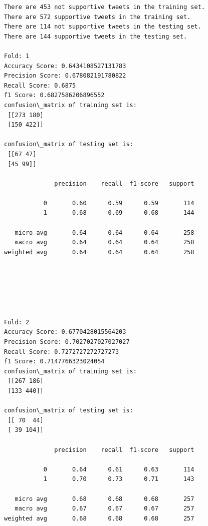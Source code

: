 \documentclass[11pt]{article}
\begin{document}
  

    \begin{Verbatim}[commandchars=\\\{\}]
There are 453 not supportive tweets in the training set.
There are 572 supportive tweets in the training set.
There are 114 not supportive tweets in the testing set.
There are 144 supportive tweets in the testing set.

Fold: 1
Accuracy Score: 0.6434108527131783
Precision Score: 0.678082191780822
Recall Score: 0.6875
f1 Score: 0.6827586206896552
confusion\_matrix of training set is: 
 [[273 180]
 [150 422]] 

confusion\_matrix of testing set is: 
 [[67 47]
 [45 99]] 

              precision    recall  f1-score   support

           0       0.60      0.59      0.59       114
           1       0.68      0.69      0.68       144

   micro avg       0.64      0.64      0.64       258
   macro avg       0.64      0.64      0.64       258
weighted avg       0.64      0.64      0.64       258


    \end{Verbatim}

    \begin{center}
    \end{center}
    { \hspace*{\fill} \\}
    
    \begin{center}
    \end{center}
    { \hspace*{\fill} \\}
    
    \begin{Verbatim}[commandchars=\\\{\}]

Fold: 2
Accuracy Score: 0.6770428015564203
Precision Score: 0.7027027027027027
Recall Score: 0.7272727272727273
f1 Score: 0.7147766323024054
confusion\_matrix of training set is: 
 [[267 186]
 [133 440]] 

confusion\_matrix of testing set is: 
 [[ 70  44]
 [ 39 104]] 

              precision    recall  f1-score   support

           0       0.64      0.61      0.63       114
           1       0.70      0.73      0.71       143

   micro avg       0.68      0.68      0.68       257
   macro avg       0.67      0.67      0.67       257
weighted avg       0.68      0.68      0.68       257


    \end{Verbatim}
\end{document}
